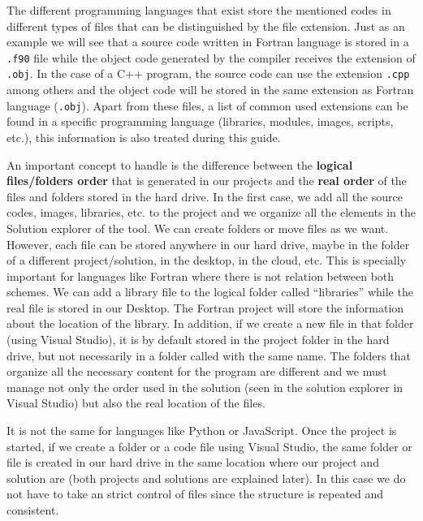 The different programming languages that exist store the mentioned codes in different types of files that can be distinguished by the file extension. Just as an example we will see that a source code written in Fortran language is stored in a \texttt{.f90} file while the object code generated by the compiler receives the extension of \texttt{.obj}. In the case of a C++ program, the source code can use the extension \texttt{.cpp} among others and the object code will be stored in the same extension as Fortran language (\texttt{.obj}). Apart from these files, a list of common used extensions can be found in a specific programming language (libraries, modules, images, scripts, etc.), this information is also treated during this guide.

An important concept to handle is the difference between the \textbf{logical files/folders order} that is generated in our projects and the \textbf{real order} of the files and folders stored in the hard drive. In the first case, we add all the source codes, images, libraries, etc. to the project and we organize all the elements in the Solution explorer of the tool. We can create folders or move files as we want. However, each file can be stored anywhere in our hard drive, maybe in the folder of a different project/solution, in the desktop, in the cloud, etc. This is specially important for languages like Fortran where there is not relation between both schemes. We can add a library file to the logical folder called ``libraries'' while the real file is stored in our Desktop. The Fortran project will store the information about the location of the library. In addition, if we create a new file in that folder (using Visual Studio), it is by default stored in the project folder in the hard drive, but not necessarily in a folder called with the same name. The folders that organize all the necessary content for the program are different and we must manage not only the order used in the solution (seen in the solution explorer in Visual Studio) but also the real location of the files. %

It is not the same for languages like Python or JavaScript. Once the project is started, if we create a folder or a code file using Visual Studio, the same folder or file is created in our hard drive in the same location where our project and solution are (both projects and solutions are explained later). In this case we do not have to take an strict control of files since the structure is repeated and consistent. 

